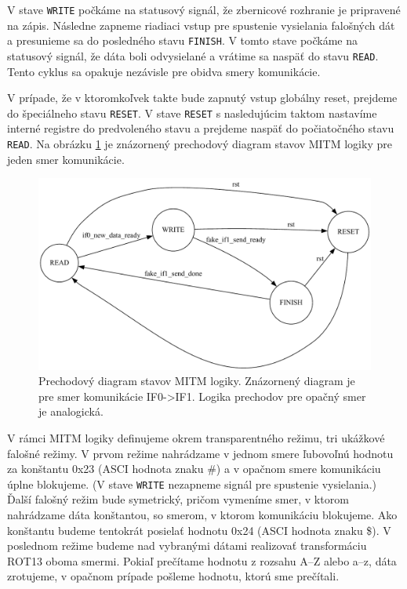 V stave \texttt{WRITE} počkáme na statusový signál, že zbernicové rozhranie je pripravené na zápis. Následne zapneme riadiaci vstup pre spustenie vysielania falošných dát a presunieme sa do posledného stavu \texttt{FINISH}. V tomto stave počkáme na statusový signál, že dáta boli odvysielané a vrátime sa naspäť do stavu \texttt{READ}. Tento cyklus sa opakuje nezávisle pre obidva smery komunikácie.

V prípade, že v ktoromkoľvek takte bude zapnutý vstup globálny reset, prejdeme do špeciálneho stavu \texttt{RESET}. V stave \texttt{RESET} s nasledujúcim taktom nastavíme interné registre do predvoleného stavu a prejdeme naspäť do počiatočného stavu \texttt{READ}. Na obrázku \ref{obr:mitmStateTransition} je znázornený prechodový diagram stavov MITM logiky pre jeden smer komunikácie.

\begin{figure}
    \centerline{\includegraphics[width=1\textwidth]{images/misc/mitmStateTransition.pdf}}
    \caption[Prechodový diagram stavov MITM logiky]{Prechodový diagram stavov MITM logiky. Znázornený diagram je pre smer komunikácie IF0->IF1. Logika prechodov pre opačný smer je analogická.}
    \label{obr:mitmStateTransition}
\end{figure}

V rámci MITM logiky definujeme okrem transparentného režimu, tri ukážkové falošné režimy. V prvom režime nahrádzame v jednom smere ľubovoľnú hodnotu za konštantu 0x23 (ASCI hodnota znaku \#) a v opačnom smere komunikáciu úplne blokujeme. (V stave \texttt{WRITE} nezapneme signál pre spustenie vysielania.) Ďalší falošný režim bude symetrický, pričom vymeníme smer, v ktorom nahrádzame dáta konštantou, so smerom, v ktorom komunikáciu blokujeme. Ako konštantu budeme tentokrát posielať hodnotu 0x24 (ASCI hodnota znaku \$). V poslednom režime budeme nad vybranými dátami realizovať transformáciu ROT13 oboma smermi. Pokiaľ prečítame hodnotu z rozsahu A--Z alebo a--z, dáta zrotujeme, v opačnom prípade pošleme hodnotu, ktorú sme prečítali.

